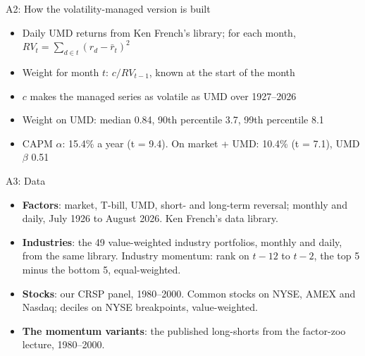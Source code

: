 \documentclass[aspectratio=169,10pt]{beamer}
\begin{document}
\begin{frame}[label=appendix_managed]{A2: How the volatility-managed version is built}
\begin{itemize}
\item Daily UMD returns from Ken French's library; for each month, $RV_t = \sum_{d \in t} (r_d - \bar r_t)^2$
\vskip 8pt
\item Weight for month $t$: $c / RV_{t-1}$, known at the start of the month
\vskip 8pt
\item $c$ makes the managed series as volatile as UMD over 1927--2026
\vskip 8pt
\item Weight on UMD: median 0.84, 90th percentile 3.7, 99th percentile 8.1
\vskip 8pt
\item CAPM $\alpha$: 15.4\% a year (t = 9.4). On market + UMD: 10.4\% (t = 7.1), UMD $\beta$ 0.51
\end{itemize}
\vskip 4pt
\hfill \hyperlink{managed}{}
\end{frame}

\begin{frame}{A3: Data}
\small
\begin{itemize}
\item \textbf{Factors}: market, T-bill, UMD, short- and long-term reversal; monthly and daily, July 1926 to August 2026. Ken French's data library.
\vskip 8pt
\item \textbf{Industries}: the 49 value-weighted industry portfolios, monthly and daily, from the same library. Industry momentum: rank on $t-12$ to $t-2$, the top 5 minus the bottom 5, equal-weighted.
\vskip 8pt
\item \textbf{Stocks}: our CRSP panel, 1980--2000. Common stocks on NYSE, AMEX and Nasdaq; deciles on NYSE breakpoints, value-weighted.
\vskip 8pt
\item \textbf{The momentum variants}: the published long-shorts from the factor-zoo lecture, 1980--2000.
\end{itemize}
\end{frame}
\end{document}
